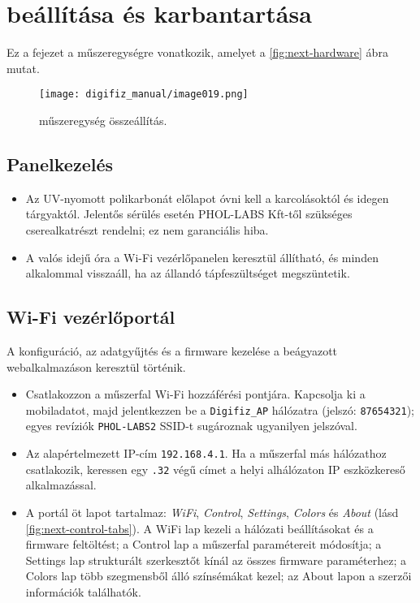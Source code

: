 \chapter{\ReplicaNextLong{} beállítása és karbantartása}\label{ch:replica-next-setup}

Ez a fejezet a \ReplicaNextLong{} műszeregységre vonatkozik, amelyet a \autoref{fig:next-hardware} ábra mutat.

\begin{figure}[htbp]
    \centering
    \texttt{[image: digifiz\_manual/image019.png]}
    \caption{\ReplicaNextLong{} műszeregység összeállítás.}
    \label{fig:next-hardware}
\end{figure}

\section{Panelkezelés}
\begin{itemize}
    \item Az UV-nyomott polikarbonát előlapot óvni kell a karcolásoktól és idegen tárgyaktól. Jelentős sérülés esetén PHOL-LABS Kft-től szükséges cserealkatrészt rendelni; ez nem garanciális hiba.
    \item A valós idejű óra a Wi-Fi vezérlőpanelen keresztül állítható, és minden alkalommal visszaáll, ha az állandó tápfeszültséget megszüntetik.
\end{itemize}

\section{Wi-Fi vezérlőportál}
A konfiguráció, az adatgyűjtés és a firmware kezelése a beágyazott webalkalmazáson keresztül történik.
\begin{itemize}
    \item Csatlakozzon a műszerfal Wi-Fi hozzáférési pontjára. Kapcsolja ki a mobiladatot, majd jelentkezzen be a \texttt{Digifiz\_AP} hálózatra (jelszó: \texttt{87654321}); egyes revíziók \texttt{PHOL-LABS2} SSID-t sugároznak ugyanilyen jelszóval.
    \item Az alapértelmezett IP-cím \texttt{192.168.4.1}. Ha a műszerfal más hálózathoz csatlakozik, keressen egy \texttt{.32} végű címet a helyi alhálózaton IP eszközkereső alkalmazással.
    \item A portál öt lapot tartalmaz: \emph{WiFi}, \emph{Control}, \emph{Settings}, \emph{Colors} és \emph{About} (lásd \autoref{fig:next-control-tabs}). A WiFi lap kezeli a hálózati beállításokat és a firmware feltöltést; a Control lap a műszerfal paramétereit módosítja; a Settings lap strukturált szerkesztőt kínál az összes firmware paraméterhez; a Colors lap több szegmensből álló színsémákat kezel; az About lapon a szerzői információk találhatók.
\end{itemize}

